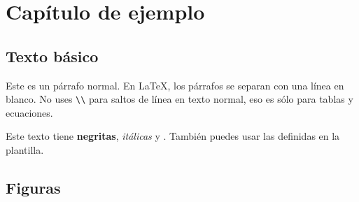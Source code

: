 %
%

\chapter{Capítulo de ejemplo}
\label{cap:ejemplo}


\section{Texto básico}

Este es un párrafo normal. En \LaTeX{}, los párrafos se separan con una línea en blanco.
No uses \texttt{\textbackslash\textbackslash} para saltos de línea en texto normal,
eso es sólo para tablas y ecuaciones.


Este texto tiene \textbf{negritas}, \textit{itálicas} y .
También puedes usar las  definidas en la plantilla.


\section{Figuras}
\label{sec:figuras}

%
%
%


